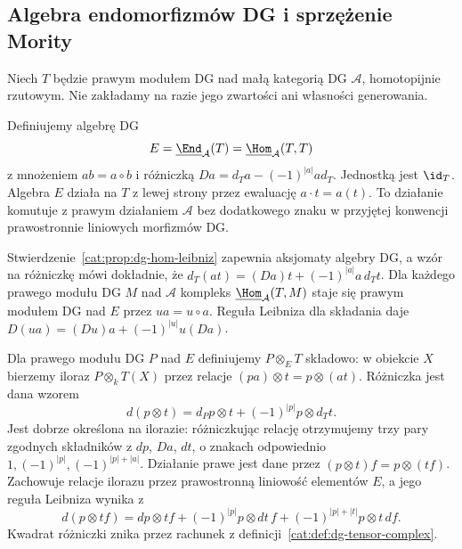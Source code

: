 \subsection{Algebra endomorfizmów DG i sprzężenie Mority}

Niech $T$ będzie prawym modułem DG nad małą kategorią DG $\mathcal A$, homotopijnie rzutowym. Nie zakładamy na razie jego zwartości ani własności generowania.

\begin{definicja}\label{cat:def:morita-end-dg}
Definiujemy algebrę DG
\[
 E=\underline{\End}_{\mathcal A}(T)
   =\underline{\Hom}_{\mathcal A}(T,T)
\]
z mnożeniem $ab=a\circ b$ i różniczką $Da=d_Ta-(-1)^{|a|}ad_T$. Jednostką jest $\id_T$. Algebra $E$ działa na $T$ z lewej strony przez ewaluację $a\cdot t=a(t)$. To działanie komutuje z prawym działaniem $\mathcal A$ bez dodatkowego znaku w przyjętej konwencji prawostronnie liniowych morfizmów DG.
\end{definicja}

Stwierdzenie~\ref{cat:prop:dg-hom-leibniz} zapewnia aksjomaty algebry DG, a wzór na różniczkę mówi dokładnie, że $d_T(at)=(Da)t+(-1)^{|a|}a\,d_Tt$. Dla każdego prawego modułu DG $M$ nad $\mathcal A$ kompleks $\underline{\Hom}_{\mathcal A}(T,M)$ staje się prawym modułem DG nad $E$ przez $ua=u\circ a$. Reguła Leibniza dla składania daje $D(ua)=(Du)a+(-1)^{|u|}u(Da)$.

Dla prawego modułu DG $P$ nad $E$ definiujemy $P\otimes_E T$ składowo: w obiekcie $X$ bierzemy iloraz $P\otimes_k T(X)$ przez relacje $(pa)\otimes t=p\otimes(at)$. Różniczka jest dana wzorem
\[
 d(p\otimes t)=d_Pp\otimes t+(-1)^{|p|}p\otimes d_Tt.
\]
Jest dobrze określona na ilorazie: różniczkując relację otrzymujemy trzy pary zgodnych składników z $dp$, $Da$, $dt$, o znakach odpowiednio $1,(-1)^{|p|},(-1)^{|p|+|a|}$. Działanie prawe jest dane przez $(p\otimes t)f=p\otimes(tf)$. Zachowuje relacje ilorazu przez prawostronną liniowość elementów $E$, a jego reguła Leibniza wynika z
\[
 d(p\otimes tf)=dp\otimes tf+(-1)^{|p|}p\otimes dt\,f
                  +(-1)^{|p|+|t|}p\otimes t\,df .
\]
Kwadrat różniczki znika przez rachunek z definicji~\ref{cat:def:dg-tensor-complex}.

